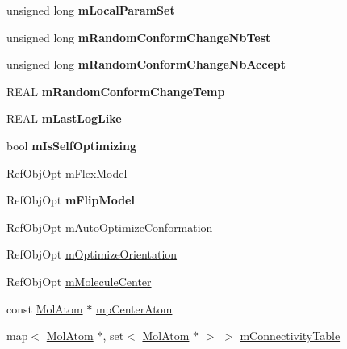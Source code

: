 \begin{DoxyCompactItemize}
unsigned long {\bfseries m\+Local\+Param\+Set}
\item 
\mbox{\label{class_obj_cryst_1_1_molecule_a6fe920696fe0d0f811e35fe677c7b664}} 
unsigned long {\bfseries m\+Random\+Conform\+Change\+Nb\+Test}
\item 
\mbox{\label{class_obj_cryst_1_1_molecule_a3a52a7e8ab51acbe58c21e5f2fac2f21}} 
unsigned long {\bfseries m\+Random\+Conform\+Change\+Nb\+Accept}
\item 
\mbox{\label{class_obj_cryst_1_1_molecule_a78242220a03384972970306eab3c84cc}} 
R\+E\+AL {\bfseries m\+Random\+Conform\+Change\+Temp}
\item 
\mbox{\label{class_obj_cryst_1_1_molecule_ae424310a32f3ed915c33524e9c325549}} 
R\+E\+AL {\bfseries m\+Last\+Log\+Like}
\item 
\mbox{\label{class_obj_cryst_1_1_molecule_a3a266d6dc8d55ee94717b0f2137f20ad}} 
bool {\bfseries m\+Is\+Self\+Optimizing}
\item 
Ref\+Obj\+Opt \mbox{\hyperlink{class_obj_cryst_1_1_molecule_a35881bfb20092d0dcc424553f5671245}{m\+Flex\+Model}}
\item 
\mbox{\label{class_obj_cryst_1_1_molecule_a79471cc60e375a7b10d0b7c528600cd7}} 
Ref\+Obj\+Opt {\bfseries m\+Flip\+Model}
\item 
Ref\+Obj\+Opt \mbox{\hyperlink{class_obj_cryst_1_1_molecule_ae8459b9f767b0d8bc27b05140c604e0c}{m\+Auto\+Optimize\+Conformation}}
\item 
Ref\+Obj\+Opt \mbox{\hyperlink{class_obj_cryst_1_1_molecule_a8c82ea548f4c0f29e868776c88c5eab8}{m\+Optimize\+Orientation}}
\item 
Ref\+Obj\+Opt \mbox{\hyperlink{class_obj_cryst_1_1_molecule_a4ac986f017f968e59af58297b4a50d7f}{m\+Molecule\+Center}}
\item 
const \mbox{\hyperlink{class_obj_cryst_1_1_mol_atom}{Mol\+Atom}} $\ast$ \mbox{\hyperlink{class_obj_cryst_1_1_molecule_a924f7062c1e35790e152a35166121266}{mp\+Center\+Atom}}
\item 
map$<$ \mbox{\hyperlink{class_obj_cryst_1_1_mol_atom}{Mol\+Atom}} $\ast$, set$<$ \mbox{\hyperlink{class_obj_cryst_1_1_mol_atom}{Mol\+Atom}} $\ast$ $>$ $>$ \mbox{\hyperlink{class_obj_cryst_1_1_molecule_a13cffa530711a868859cfcfc17bce069}{m\+Connectivity\+Table}}

\end{DoxyCompactItemize}
